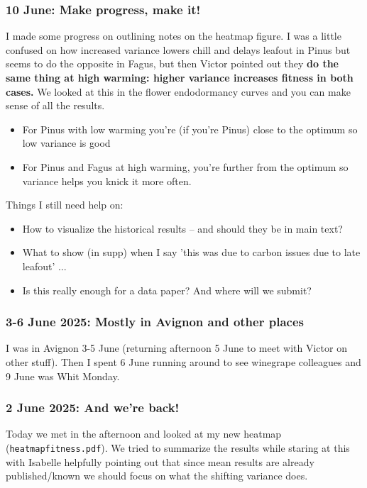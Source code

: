 \documentclass[11pt,letter]{article}
\begin{document}
\subsubsection{10 June: Make progress, make it!}

I made some progress on outlining notes on the heatmap figure. I was a little confused on how increased variance lowers chill and delays leafout in Pinus but seems to do the opposite in Fagus, but then Victor pointed out they {\bf do the same thing at high warming: higher variance increases fitness in both cases.} We looked at this in the flower endodormancy curves and you can make sense of all the results.

\begin{itemize}
\item For Pinus with low warming you're (if you're Pinus) close to the optimum so low variance is good
\item For Pinus and Fagus at high warming, you're further from the optimum so variance helps you knick it more often.
\end{itemize}

Things I still need help on:
\begin{itemize}
\item How to visualize the historical results -- and should they be in main text?
\item What to show (in supp) when I say 'this was due to carbon issues due to late leafout' ...
\item Is this really enough for a data paper? And where will we submit?
\end{itemize}

\subsubsection{3-6 June 2025: Mostly in Avignon and other places}

I was in Avignon 3-5 June (returning afternoon 5 June to meet with Victor on other stuff). Then I spent 6 June running around to see winegrape colleagues and 9 June was Whit Monday.

\subsubsection{2 June 2025: And we're back!}

Today we met in the afternoon and looked at my new heatmap (\verb|heatmapfitness.pdf|). We tried to summarize the results while staring at this with Isabelle helpfully pointing out that since mean results are already published/known we should focus on what the shifting variance does. 
\end{document}
